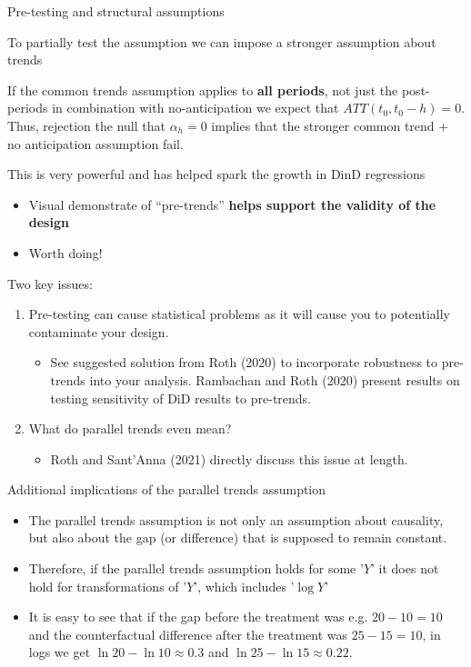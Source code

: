 \documentclass[notes,11pt, aspectratio=169]{beamer}
\newenvironment{wideitemize}{\itemize\addtolength{\itemsep}{10pt}}{\enditemize}
\begin{document}
\begin{frame}{Pre-testing and structural assumptions}
  \begin{wideitemize}
  \item To partially test the assumption we can impose a stronger assumption about trends
      \begin{wideitemize}
      \item If the common trends assumption applies to \textbf{all periods}, not just the post-periods in combination with no-anticipation we expect that $ATT(t_0,t_0-h)=0$. Thus, rejection the null that $\alpha_h=0$ implies that the stronger common trend + no anticipation assumption fail.
      \end{wideitemize}
      \item This is very powerful and has helped spark the growth in DinD regressions
    \begin{itemize}
    \item Visual demonstrate of ``pre-trends''\textbf{ helps support the validity of the design}
    \item Worth doing!
    \end{itemize}
  \item Two key issues:
    \begin{enumerate}
    \item Pre-testing can cause statistical problems as it will cause you to potentially contaminate your
      design.
    \begin{itemize}
    \item See suggested solution from Roth (2020) to incorporate robustness to
    pre-trends into your analysis. Rambachan and Roth (2020) present
    results on testing sensitivity of DiD results to pre-trends.
    \end{itemize}
    \item What do parallel trends even mean? 
    \begin{itemize}
    \item Roth and Sant'Anna (2021) directly discuss this issue at length.
    \end{itemize}
    \end{enumerate}
  \end{wideitemize}
\end{frame}

\begin{frame}{Additional implications of the parallel trends assumption}
\begin{itemize}
    \item The parallel trends assumption is not only an assumption about causality, but also about the gap (or difference) that is supposed to remain constant.
    \item Therefore, if the parallel trends assumption holds for some '$Y$' it does not hold for transformations of '$Y$', which includes '$\log Y $'
    \item It is easy to see that if the gap before the treatment was e.g. $20-10 = 10$ and the counterfactual difference after the treatment was $25-15 = 10$, in logs we get $\ln 20 - \ln 10\approx0.3$ and $\ln 25 - \ln 15\approx0.22$. 
\end{itemize}
\end{frame}
\end{document}
